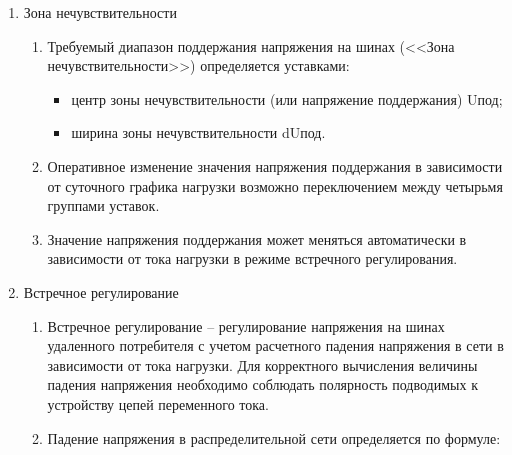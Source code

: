 \begin{enumerate}[label=\arabic{section}.\arabic{subsection}.\arabic{enumi}, labelsep=4pt, leftmargin=0pt, itemindent=57pt, itemsep=0pt, parsep=5pt]
\begin{enumerate}[label=\arabic{section}.\arabic{subsection}.\arabic{enumi}.\arabic*, labelsep=4pt, leftmargin=0em, itemindent=65pt, parsep=0pt]
        \item
        В оперативном режиме выбор регулируемой секции осуществляется с помощью виртуального ключа <<Ввод режима приоритета по 2 секции>>. При выведенном состоянии данного виртуального ключа, регулируемой является 1 секция, при введенном - 2-я. Если регулируемая секция отключена от трансформатора формируется сигнал <<Нет связи с регулируемыми шинами>>. Автоматическое регулирование при этом блокируется.
        \item 
        Дискретные сигналы <<Секция 1 включена>>, <<Секция 1 отключена>>, <<Секция 2 включена>>, <<Секция 2 отключена>>  могут поступать в логику устройства посредством дискретных входов устройства или GOOSE-сообщения.
    \end{enumerate}

\item Зона нечувствительности
    \begin{enumerate}[label=\arabic{section}.\arabic{subsection}.\arabic{enumi}.\arabic*, labelsep=4pt, leftmargin=0em, itemindent=65pt, parsep=0pt]
        \item Требуемый диапазон поддержания напряжения на шинах (<<Зона нечувствительности>>) определяется уставками:
            \begin{itemize}
                \item центр зоны нечувствительности (или напряжение поддержания) Uпод;
                \item ширина зоны нечувствительности dUпод.
            \end{itemize}
        \item 
        Оперативное изменение значения напряжения поддержания в зависимости от суточного графика нагрузки возможно переключением между четырьмя группами уставок. 
        \item
        Значение напряжения поддержания может меняться автоматически в зависимости от тока нагрузки в режиме встречного регулирования. 
        \end{enumerate}
    
\item Встречное регулирование
    \begin{enumerate}[label=\arabic{section}.\arabic{subsection}.\arabic{enumi}.\arabic*, labelsep=4pt, leftmargin=0em, itemindent=65pt, parsep=0pt]
        \item
        Встречное регулирование – регулирование напряжения на шинах удаленного потребителя с учетом расчетного падения напряжения в сети в зависимости от тока нагрузки. Для корректного вычисления величины падения напряжения необходимо соблюдать полярность подводимых к устройству цепей переменного тока.
        \item 
        Падение напряжения в распределительной сети определяется по формуле:


\end{enumerate}
\end{enumerate}
